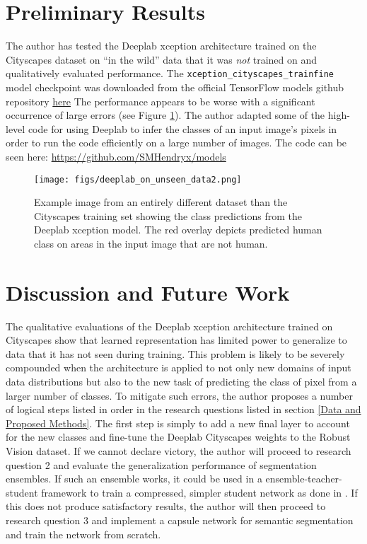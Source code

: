 \documentclass[10pt,twocolumn,letterpaper]{article}
\def\code#1{\texttt{#1}}
\begin{document}
\section{Preliminary Results}
The author has tested the Deeplab xception architecture trained on the Cityscapes dataset on \enquote{in the wild} data that it was \textit{not} trained on and
qualitatively evaluated performance. The \code{xception\_cityscapes\_trainfine} model checkpoint was downloaded from the official TensorFlow models github repository
\href{https://github.com/tensorflow/models/blob/master/research/deeplab/g3doc/model_zoo.md}{here}
The performance appears to be worse with a significant occurrence of large errors (see Figure \ref{fig:deepLabNotSeen}). The author adapted some of the high-level
code for using Deeplab to infer the classes of an input image's pixels in order to run the code efficiently on a large number of images. The code can be seen here:
\href{https://github.com/SMHendryx/models}{https://github.com/SMHendryx/models}

\begin{figure}[t]
\begin{center}
   \texttt{[image: figs/deeplab\_on\_unseen\_data2.png]}
\end{center}
   \caption{Example image from an entirely different dataset than the Cityscapes training set showing the class predictions from the Deeplab xception model.
   The red overlay depicts predicted human class on areas in the input image that are not human.}
\label{fig:deepLabNotSeen}
\end{figure}



\section{Discussion and Future Work}
The qualitative evaluations of the Deeplab xception architecture trained on Cityscapes show that learned representation has limited power to generalize
to data that it has not seen during training. This problem is likely to be severely compounded when the architecture is applied to not only new domains of input data distributions
but also to the new task of predicting the class of pixel from a larger number of classes. To mitigate such errors, the author proposes a number of logical steps listed in order in
the research questions listed in section \ref{Data and Proposed Methods}. The first step is simply to add a new final layer to account for the new classes and fine-tune the Deeplab Cityscapes weights to the Robust Vision dataset.
If we cannot declare victory, the author will proceed to research question 2 and evaluate the generalization performance of segmentation ensembles. If such an ensemble works, it could be used in a ensemble-teacher-student framework to train a compressed, simpler student network as done in \cite{buciluǎ2006model, hinton2015distilling}.
If this does not produce satisfactory results, the author will then proceed to
research question 3 and implement a capsule network for semantic segmentation and train the network from scratch.
\end{document}
